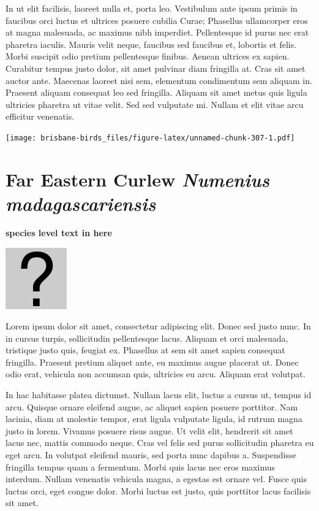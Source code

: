 \documentclass[]{book}
\let\origfigure\figure
\let\endorigfigure\endfigure
\renewenvironment{figure}[1][2] {
  \expandafter\origfigure\expandafter[H]
} {
  \endorigfigure
}
\begin{document}
In ut elit facilisis, laoreet nulla et, porta leo. Vestibulum ante ipsum
primis in faucibus orci luctus et ultrices posuere cubilia Curae;
Phasellus ullamcorper eros at magna malesuada, ac maximus nibh
imperdiet. Pellentesque id purus nec erat pharetra iaculis. Mauris velit
neque, faucibus sed faucibus et, lobortis et felis. Morbi suscipit odio
pretium pellentesque finibus. Aenean ultrices ex sapien. Curabitur
tempus justo dolor, sit amet pulvinar diam fringilla at. Cras sit amet
auctor ante. Maecenas laoreet nisi sem, elementum condimentum sem
aliquam in. Praesent aliquam consequat leo sed fringilla. Aliquam sit
amet metus quis ligula ultricies pharetra ut vitae velit. Sed sed
vulputate mi. Nullam et elit vitae arcu efficitur venenatis.

\begin{figure}
\centering
\texttt{[image: brisbane-birds\_files/figure-latex/unnamed-chunk-307-1.pdf]}
\caption{\label{fig:unnamed-chunk-307}insert figure caption}
\end{figure}

\section{\texorpdfstring{Far Eastern Curlew \emph{Numenius
madagascariensis}}{Far Eastern Curlew Numenius madagascariensis}}\label{far-eastern-curlew-numenius-madagascariensis}

\textbf{species level text in here}

\begin{figure}
\centering
\includegraphics{assets/missing.png}
\caption{No image for species}
\end{figure}

Lorem ipsum dolor sit amet, consectetur adipiscing elit. Donec sed justo
nunc. In in cursus turpis, sollicitudin pellentesque lacus. Aliquam et
orci malesuada, tristique justo quis, feugiat ex. Phasellus at sem sit
amet sapien consequat fringilla. Praesent pretium aliquet ante, eu
maximus augue placerat ut. Donec odio erat, vehicula non accumsan quis,
ultricies eu arcu. Aliquam erat volutpat.

In hac habitasse platea dictumst. Nullam lacus elit, luctus a cursus ut,
tempus id arcu. Quisque ornare eleifend augue, ac aliquet sapien posuere
porttitor. Nam lacinia, diam at molestie tempor, erat ligula vulputate
ligula, id rutrum magna justo in lorem. Vivamus posuere risus augue. Ut
velit elit, hendrerit sit amet lacus nec, mattis commodo neque. Cras vel
felis sed purus sollicitudin pharetra eu eget arcu. In volutpat eleifend
mauris, sed porta nunc dapibus a. Suspendisse fringilla tempus quam a
fermentum. Morbi quis lacus nec eros maximus interdum. Nullam venenatis
vehicula magna, a egestas est ornare vel. Fusce quis luctus orci, eget
congue dolor. Morbi luctus est justo, quis porttitor lacus facilisis sit
amet.
\end{document}
